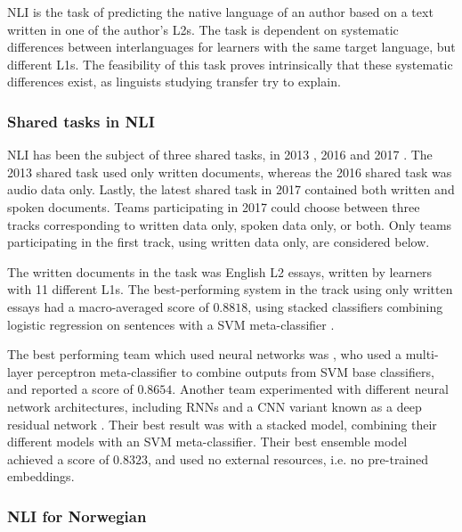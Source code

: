 \ac{NLI} is the task of predicting the native language of an author based on
a text written in one of the author's \acp{L2}. The task is
dependent on systematic differences between interlanguages for learners with
the same target language, but different L1s. The feasibility of this task
proves intrinsically that these systematic differences exist, as linguists
studying transfer try to explain.


\subsubsection{Shared tasks in NLI}

\ac{NLI} has been the subject of three shared tasks, in 2013
\autocite{tetreault2013report}, 2016 \autocite{schuller2016interspeech} and
2017 \autocite{nli17}. The 2013 shared task used only written documents,
whereas the 2016 shared task was audio data only. Lastly, the latest shared
task in 2017 contained both written and spoken documents. Teams participating
in 2017 could choose between three tracks corresponding to written data only,
spoken data only, or both. Only teams participating in the first track, using
written data only, are considered below.

The written documents in the task was English L2 essays, written by learners
with 11 different L1s. The best-performing system in the track using only
written essays had a macro-averaged \FI score of $0.8818$, using stacked
classifiers combining logistic regression on sentences with a \ac{SVM}
meta-classifier \autocite{cimino17}.

The best performing team which used neural networks was \textcite{li17}, who
used a multi-layer perceptron meta-classifier to combine outputs from
\ac{SVM} base classifiers, and reported a \FI score of $0.8654$. Another team
experimented with different neural network architectures, including \acp{RNN}
and a \ac{CNN} variant known as a deep residual network
\autocite{bjerva2017neural}. Their best result was with a stacked model,
combining their different models with an \ac{SVM} meta-classifier. Their best
ensemble model achieved a \FI score of $0.8323$, and used no external
resources, i.e. no pre-trained embeddings.


\subsubsection{NLI for Norwegian}

